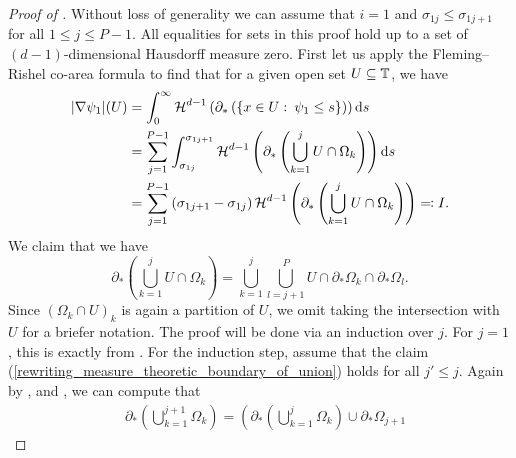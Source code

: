 \begin{proof}[Proof of ]
	Without loss of generality we can assume that $ i = 1 $ and $ \sigma_{ 1 j 
	} \leq \sigma_{ 1 j + 1 } $ for all $ 1 \leq j \leq P - 1 $. 
	All equalities for sets in this proof hold up to a set of $ 
	(d-1)$-dimensional Hausdorff measure zero. First let us apply the 
	Fleming--Rishel co-area formula to find that for a given open set $ U 
	\subseteq \operatorname{\mathbb{T}} $, we have
	\begin{align*}
		\abs{ \nabla \psi_{ 1 } } ( U ) 
		& =
		\int_{ 0 }^{ \infty }
		\operatorname{\mathcal{H}}^{ d - 1 } \left(
		\partial_{ \ast } \left(
		\left\{
		x \in U 
		\, \colon \,
		\psi_{ 1 } \leq s 
		\right\}
		\right)
		\right)
		\dd{ s }
		\\
		& =
		\sum_{ j = 1 }^{ P -1 }
		\int_{ \sigma_{ 1 j } }^{ \sigma_{ 1 j + 1 } }
		\operatorname{\mathcal{H}}^{ d - 1 } \left(
		\partial_{ \ast } \left(
		\bigcup_{ k = 1 }^{ j }
		U \cap \Omega_{ k }
		\right)
		\right)
		\dd{ s }
		\\
		& =
		\sum_{ j = 1 }^{ P - 1 }
		\left(\sigma_{ 1 j +1} - \sigma_{ 1  j } \right)
		\operatorname{\mathcal{H}}^{ d - 1 } \left(
		\partial_{ \ast } \left(
		\bigcup_{ k = 1 }^{ j }
		U \cap \Omega_{ k }
		\right)
		\right)
		\eqqcolon I. 
	\end{align*}
	We claim that we have
	\begin{equation}
		\label{rewriting_measure_theoretic_boundary_of_union}
		\partial_{ \ast } \left(
		\bigcup_{ k = 1 }^{ j }
		U \cap \Omega_{ k }
		\right)
		=
		\bigcup_{ k = 1 }^{ j }
		\bigcup_{ l = j + 1 }^{ P }
		U
		\cap
		\partial_{ \ast } \Omega_{ k }
		\cap
		\partial_{ \ast } \Omega_{ l }.
	\end{equation}
	Since $ ( \Omega_{ k } \cap U )_{ k } $ is again a partition of $ U $, we 
	omit taking the intersection with $ U $ for a briefer notation. The proof 
	will be done via an induction over $ j $. For $ j = 1 $, this is exactly 
	 from 
	. For the induction step, 
	assume that the claim (\ref{rewriting_measure_theoretic_boundary_of_union}) 
	holds for all $ j' \leq j $. Again by 
	,
	 and , we 
	can compute that
	\begin{align*}
		& \partial_{ \ast } \left(
		\bigcup_{ k = 1 }^{ j + 1 }
		\Omega_{ k }
		\right)
		=
		\left(
		\partial_{ \ast } \left(
		\bigcup_{ k = 1 }^{ j }
		\Omega_{ k }
		\right)
		\cup
		\partial_{ \ast } \Omega_{ j + 1 }

\end{align*}
\end{proof}

